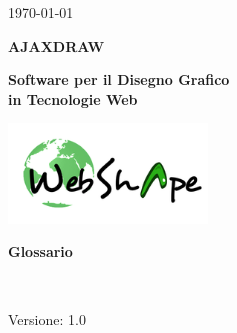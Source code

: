 
\title{\TITOLODOC}
\author{Mirco Geremia}



\renewcommand{\insertversion}{1.0} %
\renewcommand{\TITOLODOC}{Glossario} %
\renewcommand{\glosspath}{.\glossario} %

\begin{titlepage}
\begin{center}
	\begin{Large}	\today \end{Large}
\end{center}

\vspace{20pt}

\begin{center}
	\begin{Huge}
				\textbf{AJAXDRAW}
	\end{Huge}
\end{center}			

\begin{center}
	\begin{large}
				\textbf{Software per il Disegno Grafico\\ in Tecnologie Web}
	\end{large}
\end{center}			

\vspace{20pt}

\begin{center}
\includegraphics[width=150pt]{../logo/logo}
\end{center}

\vspace{170pt}
\begin{center} %
	\begin{Huge}
				\textbf{\TITOLODOC}
	\end{Huge}
			\\
\end{center}
\vspace{210pt}
\begin{center}
Versione: \insertversion
\end{center}
\end{titlepage}


